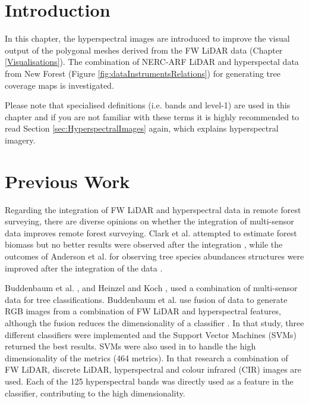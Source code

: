 \documentclass{subfiles}
\begin{document}
	
	\section{Introduction}	
	\par In this chapter, the hyperspectral images are introduced to improve the visual output of the polygonal meshes derived from the FW LiDAR data (Chapter \ref{Visualisations}).  The combination of NERC-ARF LiDAR and hyperspectal data from New Forest (Figure \ref{fig:dataInstrumentsRelations}) for generating tree coverage maps is investigated.
	
   {\color{blue} Please note that specialised definitions (i.e. bands and level-1) are used in this chapter and if you are not familiar with these terms it is highly recommended to read Section \ref{sec:HyperspectralImages} again, which explains hyperspectral imagery.}
	
	\section{Previous Work}
	
	\par Regarding the integration of FW LiDAR and hyperspectral data in remote forest surveying, there are diverse opinions on whether the integration of multi-sensor data improves remote forest surveying. Clark et al. attempted to estimate forest biomass but no better results were observed after the integration \cite{Clark2011}, while the outcomes of Anderson et al. for observing tree species abundances structures were improved after the integration of the data \cite{Anderson2008}. 
	
	\par  Buddenbaum et al. \cite{Buddenbaum2013}, and Heinzel and Koch \cite{Heinzel2012}, used a combination of multi-sensor data for tree classifications. Buddenbaum et al. use fusion of data to generate RGB images from a combination of FW LiDAR and hyperspectral features, although the fusion reduces the dimensionality of a classifier \cite{Buddenbaum2013}. In that study, three different classifiers were implemented and the Support Vector Machines (SVMs) returned the best results. SVMs were also used in \cite{Heinzel2012} to handle the high dimensionality of the metrics (464 metrics). In that research a combination of FW LiDAR, discrete LiDAR, hyperspectral and colour infrared (CIR) images are used. Each of the 125 hyperspectral bands was directly used as a feature in the classifier, contributing to the high dimensionality. 
 
\end{document}
